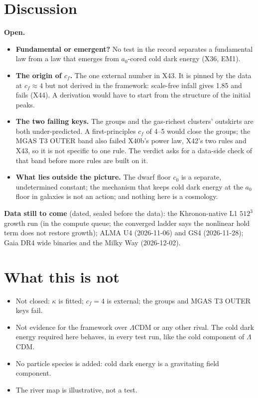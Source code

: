 \documentclass[10pt]{article}
\begin{document}
\section{Discussion}
\textbf{Open.}
\begin{itemize}
\item \textbf{Fundamental or emergent?} No test in the record separates a fundamental law from a law that emerges from $a_0$-cored cold dark energy (X36, EM1).
\item \textbf{The origin of $c_f$.} The one external number in X43. It is pinned by the data at $c_f\approx4$ but not derived in the framework: scale-free infall gives 1.85 and fails (X44). A derivation would have to start from the structure of the initial peaks.
\item \textbf{The two failing keys.} The groups and the gas-richest clusters' outskirts are both under-predicted. A first-principles $c_f$ of 4--5 would close the groups; the MGAS T3 OUTER band also failed X40b's power law, X42's two rules and X43, so it is not specific to one rule. The verdict asks for a data-side check of that band before more rules are built on it.
\item \textbf{What lies outside the picture.} The dwarf floor $c_0$ is a separate, undetermined constant; the mechanism that keeps cold dark energy at the $a_0$ floor in galaxies is not an action; and nothing here is a cosmology.
\end{itemize}

\textbf{Data still to come} (dated, sealed before the data): the Khronon-native L1 $512^3$ growth run (in the compute queue; the converged ladder says the nonlinear hold term does not restore growth); ALMA U4 (2026-11-06) and GS4 (2026-11-28); Gaia DR4 wide binaries and the Milky Way (2026-12-02).

\section{What this is not}
\begin{itemize}
\item Not closed: $\kappa$ is fitted; $c_f=4$ is external; the groups and MGAS T3 OUTER keys fail.
\item Not evidence for the framework over $\Lambda$CDM or any other rival. The cold dark energy required here behaves, in every test run, like the cold component of $\Lambda$CDM.
\item No particle species is added: cold dark energy is a gravitating field component.
\item The river map is illustrative, not a test.
\end{itemize}
\end{document}
